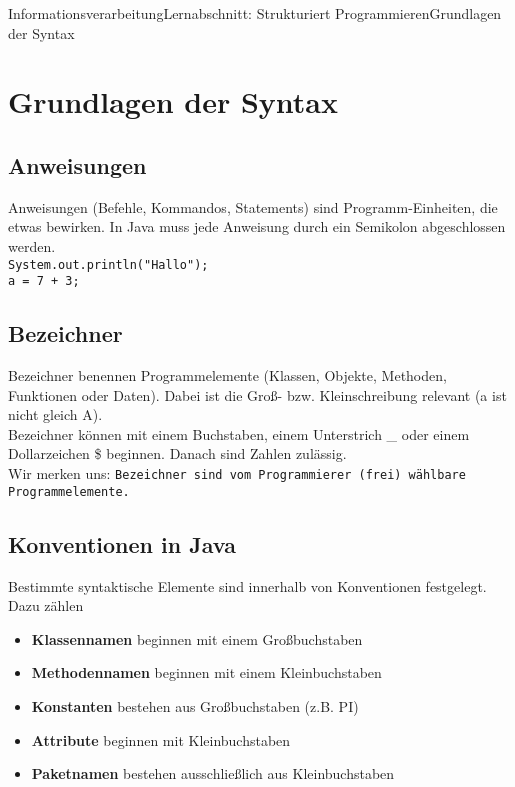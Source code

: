 \documentclass[11pt,oneside,openany,headings=optiontotoc,11pt,numbers=noenddot]{article}
\begin{document}
	\begin{worksheet}{Informationsverarbeitung}{Lernabschnitt: Strukturiert Programmieren}{Grundlagen der Syntax}
		\setlength{\columnseprule}{0pt}
		\setcounter{section}{3}
		\setcounter{page}{12}
		\section{Grundlagen der Syntax}
		\subsection{Anweisungen}
		Anweisungen (Befehle, Kommandos, Statements) sind Programm-Einheiten, die \grqq{}etwas bewirken\grqq{}. In Java muss jede Anweisung durch ein Semikolon abgeschlossen werden.\\
		\lstinline[style=JavaInputStyle]|System.out.println("Hallo");|\\
		\lstinline[style=JavaInputStyle]|a = 7 + 3;|
		
		\subsection{Bezeichner}
		Bezeichner benennen Programmelemente (Klassen, Objekte, Methoden, Funktionen oder Daten). Dabei ist die Groß- bzw. Kleinschreibung relevant (a ist nicht gleich A).\\
		Bezeichner können mit einem Buchstaben, einem Unterstrich \_ oder einem Dollarzeichen \$ beginnen. Danach sind Zahlen zulässig.\\
		Wir merken uns: \texttt{Bezeichner sind vom Programmierer (frei) wählbare Programmelemente.}
		
		\subsection{Konventionen in Java}
		Bestimmte syntaktische Elemente sind innerhalb von Konventionen festgelegt. Dazu zählen
		\begin{itemize}
			\item \textbf{Klassennamen} beginnen mit einem Großbuchstaben
			\item \textbf{Methodennamen} beginnen mit einem Kleinbuchstaben
			\item \textbf{Konstanten} bestehen aus Großbuchstaben (z.B. PI)
			\item \textbf{Attribute} beginnen mit Kleinbuchstaben
			\item \textbf{Paketnamen} bestehen ausschließlich aus Kleinbuchstaben
		\end{itemize}
		

\end{worksheet}
\end{document}

